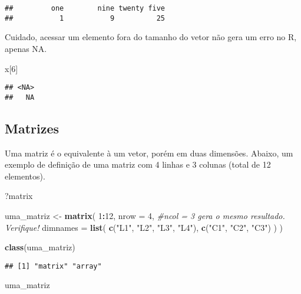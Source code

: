 \documentclass[]{book}
\newenvironment{Shaded}{\begin{snugshade}}{\end{snugshade}}
\newcommand{\CommentTok}[1]{\textcolor[rgb]{0.56,0.35,0.01}{\textit{#1}}}
\newcommand{\DataTypeTok}[1]{\textcolor[rgb]{0.13,0.29,0.53}{#1}}
\newcommand{\DecValTok}[1]{\textcolor[rgb]{0.00,0.00,0.81}{#1}}
\newcommand{\KeywordTok}[1]{\textcolor[rgb]{0.13,0.29,0.53}{\textbf{#1}}}
\newcommand{\NormalTok}[1]{#1}
\newcommand{\OperatorTok}[1]{\textcolor[rgb]{0.81,0.36,0.00}{\textbf{#1}}}
\newcommand{\StringTok}[1]{\textcolor[rgb]{0.31,0.60,0.02}{#1}}
\theoremstyle{definition}
\theoremstyle{definition}
\theoremstyle{definition}
\theoremstyle{remark}
\begin{document}
\begin{verbatim}
##         one        nine twenty five 
##           1           9          25
\end{verbatim}

Cuidado, acessar um elemento fora do tamanho do vetor não gera um erro no R, apenas NA.

\begin{Shaded}
\begin{Highlighting}[]
\NormalTok{x[}\DecValTok{6}\NormalTok{]}
\end{Highlighting}
\end{Shaded}

\begin{verbatim}
## <NA> 
##   NA
\end{verbatim}

\hypertarget{matrizes}{%
\subsection{Matrizes}\label{matrizes}}

Uma matriz é o equivalente à um vetor, porém em duas dimensões.
Abaixo, um exemplo de definição de uma matriz com 4 linhas e 3 colunas (total de 12 elementos).

\begin{Shaded}
\begin{Highlighting}[]
\NormalTok{?matrix}

\NormalTok{uma_matriz <-}\StringTok{ }\KeywordTok{matrix}\NormalTok{(}
      \DecValTok{1}\OperatorTok{:}\DecValTok{12}\NormalTok{,}
      \DataTypeTok{nrow =} \DecValTok{4}\NormalTok{, }\CommentTok{#ncol = 3 gera o mesmo resultado. Verifique!}
      \DataTypeTok{dimnames =} \KeywordTok{list}\NormalTok{(}
        \KeywordTok{c}\NormalTok{(}\StringTok{"L1"}\NormalTok{, }\StringTok{"L2"}\NormalTok{, }\StringTok{"L3"}\NormalTok{, }\StringTok{"L4"}\NormalTok{),}
        \KeywordTok{c}\NormalTok{(}\StringTok{"C1"}\NormalTok{, }\StringTok{"C2"}\NormalTok{, }\StringTok{"C3"}\NormalTok{)}
\NormalTok{      )}
\NormalTok{)}

\KeywordTok{class}\NormalTok{(uma_matriz)}
\end{Highlighting}
\end{Shaded}

\begin{verbatim}
## [1] "matrix" "array"
\end{verbatim}

\begin{Shaded}
\begin{Highlighting}[]
\NormalTok{uma_matriz}
\end{Highlighting}
\end{Shaded}
\end{document}
